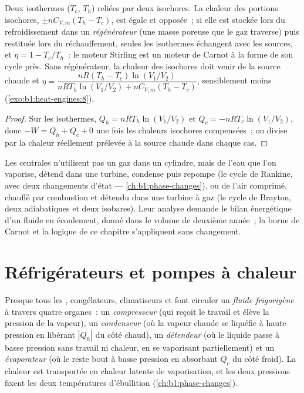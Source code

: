 \begin{proposition}\label{prop:b1:heat-engines:stirling}
Deux isothermes ($T_c$, $T_h$) reliées par deux isochores. La chaleur des
portions isochores, $\pm nC_{V,m}(T_h - T_c)$, est égale et opposée~; si elle
est stockée lors du refroidissement dans un \emph{régénérateur} (une masse
poreuse que le gaz traverse) puis restituée lors du réchauffement, seules les
isothermes échangent avec les sources, et $\eta = 1 - T_c/T_h$~: le moteur
Stirling est un moteur de Carnot à la forme de son cycle près. Sans
régénérateur, la chaleur des isochores doit venir de la source chaude et
$\eta = \dfrac{nR(T_h - T_c)\ln(V_1/V_2)}{nRT_h\ln(V_1/V_2) + nC_{V,m}(T_h - T_c)}$,
sensiblement moins (\cref{exo:b1:heat-engines:8}).
\end{proposition}

\begin{proof}
Sur les isothermes, $Q_h = nRT_h\ln(V_1/V_2)$ et $Q_c = -nRT_c\ln(V_1/V_2)$, donc
$-W = Q_h + Q_c + 0$ une fois les chaleurs isochores compensées~; on divise par
la chaleur réellement prélevée à la source chaude dans chaque cas.
\end{proof}

\begin{remark}\label{rem:b1:heat-engines:turbines}
Les centrales n'utilisent pas un gaz dans un cylindre, mais de l'eau que
l'on vaporise, détend dans une turbine, condense puis repompe (le cycle de
Rankine, avec deux changements d'état --- \cref{ch:b1:phase-changes}), ou de
l'air comprimé, chauffé par combustion et détendu dans une turbine à gaz (le
cycle de Brayton, deux adiabatiques et deux isobares). Leur analyse demande
le bilan énergétique d'un fluide en écoulement, donné dans le volume de
deuxième année~; la borne de Carnot et la logique de ce chapitre s'appliquent sans changement.
\end{remark}

\section{Réfrigérateurs et pompes à chaleur}

\begin{definition}\label{def:b1:heat-engines:vapourcycle}
Presque tous les , congélateurs, climatiseurs et  font circuler un \emph{fluide frigorigène} à travers quatre organes~:
un \emph{compresseur} (qui reçoit le travail et élève la pression de la
vapeur), un \emph{condenseur} (où la vapeur chaude se liquéfie à haute
pression en libérant $|Q_h|$ du côté chaud), un \emph{détendeur} (où le
liquide passe à basse pression sans travail ni chaleur, en se vaporisant
partiellement) et un \emph{évaporateur} (où le reste bout à basse pression en
absorbant $Q_c$ du côté froid). La chaleur est transportée en chaleur latente
de vaporisation, et les deux pressions fixent les deux températures
d'ébullition (\cref{ch:b1:phase-changes}).
\end{definition}

